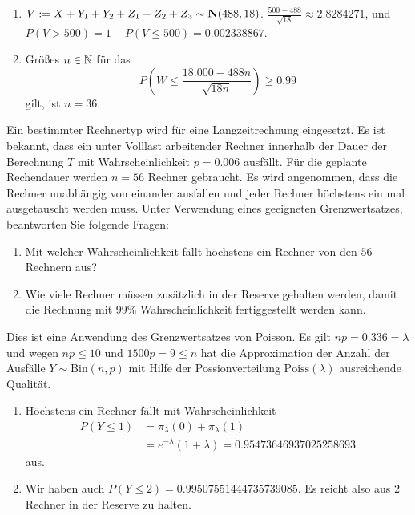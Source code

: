 \solution
\begin{enumerate}
    \item $V := X + Y_1 + Y_2 + Z_1+Z_2+Z_3 \sim  \mathbf N(488, 18)$. $\frac{500 -
        488}{\sqrt{18}} \approx 2.8284271$, und $P(V>500)= 1 - P(V\leq 500) =
        0.002338867$.
    \item Größes $n\in \mathbb N$ für das
        \begin{equation*}
            P\left( W \leq \frac{18.000 - 488 n }{\sqrt{18 n}} \right) \geq 0.99
        \end{equation*}
        gilt, ist $n=36$. 
\end{enumerate}

Ein bestimmter Rechnertyp wird für eine Langzeitrechnung eingesetzt. Es ist
bekannt, dass ein unter Volllast arbeitender Rechner innerhalb der Dauer der
Berechnung $T$ mit Wahrscheinlichkeit $p=0.006$ ausfällt. Für die geplante
Rechendauer werden $n=56$ Rechner gebraucht. Es wird angenommen, dass die
Rechner unabhängig von einander ausfallen und jeder Rechner höchstens ein mal
ausgetauscht werden muss. Unter Verwendung eines geeigneten  Grenzwertsatzes,
beantworten Sie folgende Fragen:
\begin{enumerate}
    \item Mit welcher Wahrscheinlichkeit fällt höchstens ein Rechner von den
        $56$ Rechnern aus?
    \item Wie viele Rechner müssen zusätzlich in der Reserve gehalten werden,
        damit die Rechnung mit $99\%$ Wahrscheinlichkeit fertiggestellt werden
        kann. 
\end{enumerate}

\solution
Dies ist eine Anwendung des Grenzwertsatzes von Poisson. Es gilt $np= 0.336 =
\lambda$ und wegen $np\leq 10$ und $1500p = 9 \leq n$ hat die Approximation der
Anzahl der Ausfälle $Y \sim \text{Bin}(n,p)$ mit Hilfe der Possionverteilung
$\text{Poiss}(\lambda)$ ausreichende Qualität.
\begin{enumerate}
    \item Höchstens ein Rechner fällt mit Wahrscheinlichkeit 
        \begin{align*}
            P(Y \leq 1) &= \pi_{\lambda}(0) + \pi_{\lambda}(1) \\
            &= e^{-\lambda}\left( 1 + \lambda \right) = 0.95473646937025258693 
        \end{align*}
        aus.

    \item Wir haben auch $P(Y\leq 2) = 0.99507551444735739085$. Es reicht also aus $2$
        Rechner in der Reserve zu halten. 
\end{enumerate}


